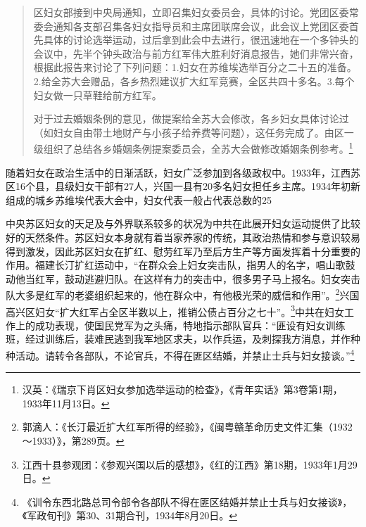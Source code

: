\begin{quote}

区妇女部接到中央局通知，立即召集妇女委员会，具体的讨论。党团区委常委会通知各支部召集各妇女指导员和主席团联席会议，此会议上党团区委首先具体的讨论选举运动，过后拿到此会中去进行，很迅速地在一个多钟头的会议中，先半个钟头政治与前方红军伟大胜利好消息报告，她们非常兴奋，根据此报告来讨论了下列问题：1.妇女在苏维埃选举百分之二十五的准备。2.给全苏大会赠品，各乡热烈建议扩大红军竞赛，全区共四十多名。3.每个妇女做一只草鞋给前方红军。

对于过去婚姻条例的意见，做提案给全苏大会修改，各乡妇女具体讨论过（如妇女自由带土地财产与小孩子给养费等问题），这任务完成了。由区一级组织了总结各乡婚姻条例提案委员会，全苏大会做修改婚姻条例参考。\footnote{汉英：《瑞京下肖区妇女参加选举运动的检查》，《青年实话》第3卷第1期，1933年11月13日。}
\end{quote}


随着妇女在政治生活中的日渐活跃，妇女广泛参加到各级政权中。1933年，江西苏区16个县，县级妇女干部有27人，兴国一县有20多名妇女担任乡主席。1934年初新组成的城乡苏维埃代表大会中，妇女代表一般占代表总数的25%


中央苏区妇女的天足及与外界联系较多的状况为中共在此展开妇女运动提供了比较好的天然条件。苏区妇女本身就有着当家养家的传统，其政治热情和参与意识较易得到激发，因此苏区妇女在扩红、慰劳红军乃至后方生产等方面发挥着十分重要的作用。福建长汀扩红运动中，“在群众会上妇女突击队，指男人的名字，唱山歌鼓动他当红军，鼓动逃避归队。在这样有力的突击中，很多男子马上报名。妇女突击队大多是红军的老婆组织起来的，他在群众中，有他极光荣的威信和作用”。\footnote{郭滴人：《长汀最近扩大红军所得的经验》，《闽粤赣革命历史文件汇集（1932～1933）》，第289页。}兴国高兴区妇女“扩大红军占全区半数以上，推销公债占百分之七十”。\footnote{江西十县参观团：《参观兴国以后的感想》，《红的江西》第18期，1933年1月29日。}中共在妇女工作上的成功表现，使国民党军为之头痛，特地指示部队官兵：“匪设有妇女训练班，经过训练后，装难民逃到我军地区求夫，以作兵运，及刺探我方消息，并作种种活动。请转令各部队，不论官兵，不得在匪区结婚，并禁止士兵与妇女接谈。”\footnote{《训令东西北路总司令部令各部队不得在匪区结婚并禁止士兵与妇女接谈》，《军政旬刊》第30、31期合刊，1934年8月20日。}


